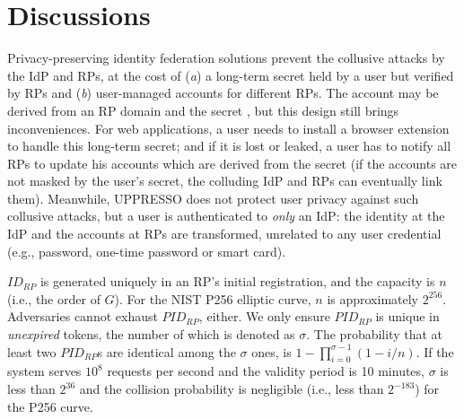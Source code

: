 \section{Discussions}
\label{sec:discussion}

Privacy-preserving identity federation solutions \cite{ELPASSO,UnlimitID,idemix,PseudoID,Opaak,uprov}
 prevent the collusive attacks by the IdP and RPs,
    at the cost of (\emph{a}) a long-term secret held by a user but verified by RPs
        and (\emph{b}) user-managed accounts \cite{PseudoID} for different RPs.
The account may be derived from an RP domain and the secret \cite{ELPASSO,UnlimitID,Opaak,uprov,idemix},
  but this design still brings inconveniences.
For web applications, a user needs to install a browser extension to handle this long-term secret;
  and if it is lost or leaked,
       a user has to notify all RPs to update his accounts which are derived from the secret
        (if the accounts are not masked by the user's secret, the colluding IdP and RPs can eventually link them).
Meanwhile,
UPPRESSO does not protect user privacy against such collusive attacks,
    but a user is authenticated to \emph{only} an IdP:
         the identity at the IdP and the accounts at RPs
                are transformed, unrelated to any user credential (e.g., password, one-time password or smart card).




\vspace{0.5mm}
$ID_{RP}$ is generated uniquely in an RP's initial registration,
    and the capacity is $n$ (i.e., the order of $G$). For the NIST P256 elliptic curve, $n$ is approximately $2^{256}$.
Adversaries cannot exhaust $PID_{RP}$, either.
We only ensure $PID_{RP}$ is unique in \emph{unexpired} tokens,
    the number of which is denoted as $\sigma$.
The probability that at least two $PID_{RP}$s are identical among the $\sigma$ ones,
    is $1-\prod_{i=0}^{\sigma-1}(1-i/n)$.
If the system serves $10^{8}$ requests per second and the validity period is 10 minutes,
     $\sigma$ is less than $2^{36}$ and the collision probability is negligible (i.e., less than $2^{-183}$) for the P256 curve.

